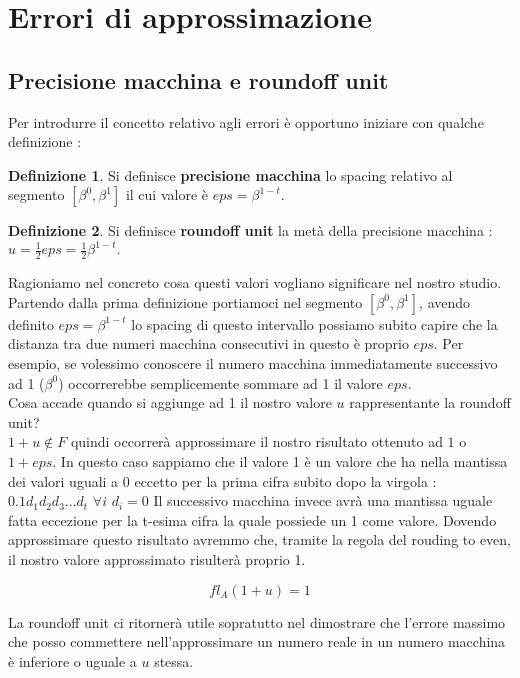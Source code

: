 \documentclass[12pt, a4paper]{book}
\theoremstyle{definition}
\newtheorem{defn}{Definizione}[section]
\begin{document}
\section{Errori di approssimazione}

\subsection{Precisione macchina e roundoff unit}
\begin{flushleft}
Per introdurre il concetto relativo agli errori è opportuno iniziare con qualche definizione :
\begin{defn}
Si definisce \textbf{precisione macchina} lo spacing relativo al segmento $[\beta^0, \beta^1]$ il cui valore è $eps = \beta^{1-t}.$
\end{defn}
\begin{defn}
Si definisce  \textbf{roundoff unit} la metà della precisione macchina : $u = \frac{1}{2}eps =  \frac{1}{2}\beta^{1-t}.$
\end{defn}

Ragioniamo nel concreto cosa questi valori vogliano significare nel nostro studio.\\
Partendo dalla prima definizione portiamoci nel segmento $[\beta^0, \beta^1]$, avendo definito $eps = \beta^{1-t}$ lo spacing di questo intervallo possiamo subito capire che la distanza tra due numeri macchina consecutivi in questo è proprio $eps$.
Per esempio,  se volessimo conoscere il numero macchina immediatamente successivo ad 1 ($\beta^{0}$) occorrerebbe semplicemente sommare ad 1 il valore $eps$. \\
Cosa accade quando si aggiunge ad 1 il nostro valore $u$ rappresentante la roundoff unit? \\
$ 1 + u \notin F$ quindi occorrerà approssimare il nostro risultato ottenuto ad $1$ o $1+eps$.  In questo caso sappiamo che il valore 1 è un valore che ha nella mantissa dei valori uguali a 0 eccetto per la prima cifra subito dopo la virgola : $0.1d_{1}d_{2}d_{3}...d_{t}$ $\forall i $ $d_{i} = 0$
Il successivo macchina invece avrà una mantissa uguale fatta eccezione per la t-esima cifra la quale possiede un 1 come valore.  Dovendo approssimare questo risultato avremmo che, tramite la regola del rouding to even, il nostro valore approssimato risulterà proprio 1. 

\[ fl_{A}(1+u) = 1  \]

La roundoff unit ci ritornerà utile sopratutto nel dimostrare che l'errore massimo che posso commettere nell'approssimare un numero reale in un numero macchina è inferiore o uguale a $u$ stessa. 
\end{flushleft}
\end{document}
